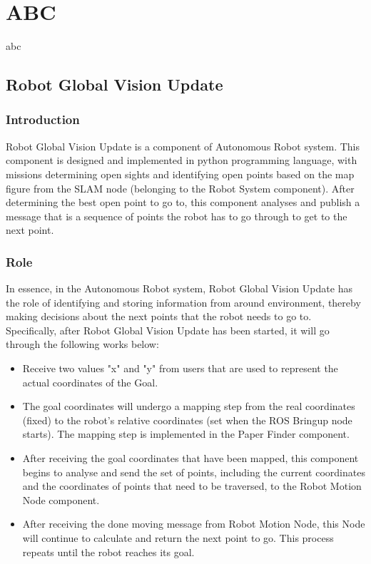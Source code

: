 \documentclass[13pt,a4paper]{article}
\begin{document}
	\section{ABC}	
	abc
	\newpage
	
	\subsection{Robot Global Vision Update}
		\subsubsection{Introduction}
		Robot Global Vision Update is a component of Autonomous Robot system. This component is designed and implemented in python programming language, with missions determining open sights and identifying open points based on the map figure from the SLAM node (belonging to the Robot System component). After determining the best open point to go to, this component analyses and publish a message that is a sequence of points the robot has to go through to get to the next point.
		\subsubsection{Role}
		In essence, in the Autonomous Robot system, Robot Global Vision Update has the role of identifying and storing information from around environment, thereby making decisions about the next points that the robot needs to go to. \\
		Specifically, after Robot Global Vision Update has been started, it will go through the following works below:
		\begin{itemize}
			\item Receive two values "x" and "y" from users that are used to represent the actual coordinates of the Goal.
			\item The goal coordinates will undergo a mapping step from the real coordinates (fixed) to the robot's relative coordinates (set when the ROS Bringup node starts). The mapping step is implemented in the Paper Finder component.
			\item After receiving the goal coordinates that have been mapped, this component begins to analyse and send the set of points, including the current coordinates and the coordinates of points that need to be traversed, to the Robot Motion Node component.
			\item After receiving the done moving message from Robot Motion Node, this Node will continue to calculate and return the next point to go. This process repeats until the robot reaches its goal.
		\end{itemize}
		
\end{document}
